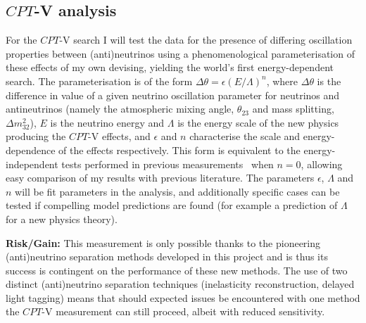 \documentclass[a4paper,11pt]{article}
\newcounter{bar}
\begin{document}

\subsection{$CPT$-V analysis}


For the $CPT$-V search I will test the data for the presence of differing oscillation properties between (anti)neutrinos using a phenomenological parameterisation of these effects of my own devising, yielding the world's first energy-dependent search. The parameterisation is of the form $\Delta \theta = \epsilon (E/\Lambda)^n$, where $\Delta \theta$ is the difference in value of a given neutrino oscillation parameter for neutrinos and antineutrinos (namely the atmospheric mixing angle, $\theta_{23}$ and mass splitting, $\Delta m^2_{32}$), $E$ is the neutrino energy and $\Lambda$ is the energy scale of the new physics producing the $CPT$-V effects, and $\epsilon$ and $n$ characterise the scale and energy-dependence of the effects respectively. This form is equivalent to the energy-independent tests performed in previous measurements~\cite{Adamson:2013whj} when $n=0$, allowing easy comparison of my results with previous literature. The parameters $\epsilon$, $\Lambda$ and $n$ will be fit parameters in the analysis, and additionally specific cases can be tested if compelling model predictions are found (for example a prediction of $\Lambda$ for a new physics theory).

\textbf{Risk/Gain:} This measurement is only possible thanks to the pioneering (anti)neutrino separation methods developed in this project and is thus its success is contingent on the performance of these new methods. The use of two distinct (anti)neutrino separation techniques (inelasticity reconstruction, delayed light tagging) means that should expected issues be encountered with one method the $CPT$-V measurement can still proceed, albeit with reduced sensitivity.
\end{document}
